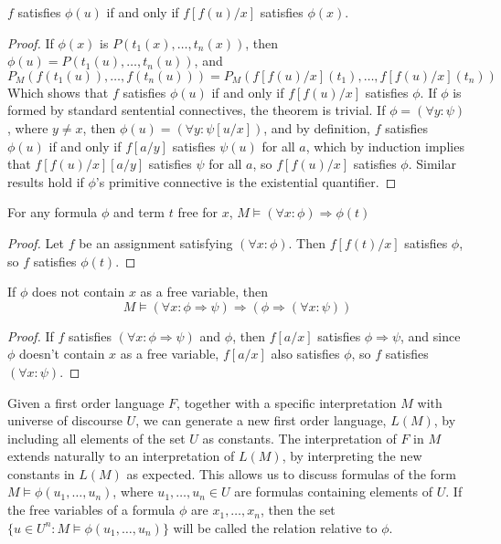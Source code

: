 \begin{lemma}
    $f$ satisfies $\phi(u)$ if and only if $f[f(u)/x]$ satisfies $\phi(x)$.
\end{lemma}
\begin{proof}
    If $\phi(x)$ is $P(t_1(x), \dots, t_n(x))$, then $\phi(u) = P(t_1(u), \dots, t_n(u))$, and
    \[ P_M(f(t_1(u)), \dots, f(t_n(u))) = P_M(f[f(u)/x](t_1), \dots, f[f(u)/x](t_n)) \]
    Which shows that $f$ satisfies $\phi(u)$ if and only if $f[f(u)/x]$ satisfies $\phi$. If $\phi$ is formed by standard sentential connectives, the theorem is trivial. If $\phi = (\forall y: \psi)$, where $y \neq x$, then $\phi(u) = (\forall y: \psi[u/x])$, and by definition, $f$ satisfies $\phi(u)$ if and only if $f[a/y]$ satisfies $\psi(u)$ for all $a$, which by induction implies that $f[f(u)/x][a/y]$ satisfies $\psi$ for all $a$, so $f[f(u)/x]$ satisfies $\phi$. Similar results hold if $\phi$'s primitive connective is the existential quantifier.
\end{proof}

\begin{theorem}
    For any formula $\phi$ and term $t$ free for $x$, $M \vDash (\forall x : \phi) \Rightarrow \phi(t)$
\end{theorem}
\begin{proof}
    Let $f$ be an assignment satisfying $(\forall x: \phi)$. Then $f[f(t)/x]$ satisfies $\phi$, so $f$ satisfies $\phi(t)$.
\end{proof}

\begin{theorem}
    If $\phi$ does not contain $x$ as a free variable, then
    \[ M \vDash (\forall x: \phi \Rightarrow \psi) \Rightarrow (\phi \Rightarrow (\forall x: \psi)) \]
\end{theorem}
\begin{proof}
    If $f$ satisfies $(\forall x: \phi \Rightarrow \psi)$ and $\phi$, then $f[a/x]$ satisfies $\phi \Rightarrow \psi$, and since $\phi$ doesn't contain $x$ as a free variable, $f[a/x]$ also satisfies $\phi$, so $f$ satisfies $(\forall x : \psi)$.
\end{proof}

Given a first order language $F$, together with a specific interpretation $M$ with universe of discourse $U$, we can generate a new first order language, $L(M)$, by including all elements of the set $U$ as constants. The interpretation of $F$ in $M$ extends naturally to an interpretation of $L(M)$, by interpreting the new constants in $L(M)$ as expected. This allows us to discuss formulas of the form $M \vDash \phi(u_1, \dots, u_n)$, where $u_1, \dots, u_n \in U$ are formulas containing elements of $U$. If the free variables of a formula $\phi$ are $x_1, \dots, x_n$, then the set $\{ u \in U^n : M \vDash \phi(u_1,\dots,u_n) \}$ will be called the relation relative to $\phi$.

